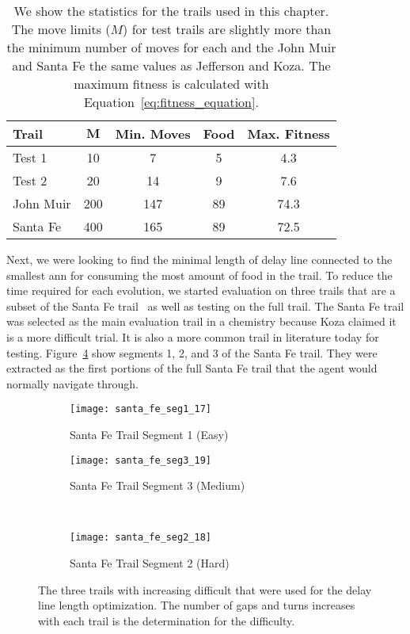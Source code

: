 \begin{table}[ht]
\centering
\begin{tabular}{lcccc}
\textbf{Trail}  & $\bm{M}$  & \textbf{Min. Moves} & \textbf{Food} & \textbf{Max. Fitness} \\ \hline
Test 1    & 10  & 7   & 5  & 4.3 \\ 
Test 2    & 20  & 14  & 9  & 7.6 \\
John Muir & 200 & 147 & 89 & 74.3 \\
Santa Fe  & 400 & 165 & 89 & 72.5
\end{tabular}
\caption[Moves Limits for Test Runs]{We show the statistics for the trails used in this chapter. The move limits ($M$) for test trails are slightly more than the minimum number of moves for each and the John Muir and Santa Fe the same values as Jefferson and Koza. The maximum fitness is calculated with Equation~\ref{eq:fitness_equation}.}
\label{tab:testing_moves_limit}
\end{table}

Next, we were looking to find the minimal length of delay line connected to the smallest \gls{ann} for consuming the most amount of food in the trail. To reduce the time required for each evolution, we started evaluation on three trails that are a subset of the Santa Fe trail~\cite{Koza1992-xs} as well as testing on the full trail. The Santa Fe trail was selected as the main evaluation trail in a chemistry because Koza claimed it is a more difficult trial. It is also a more common trail in literature today for testing. Figure~\ref{fig:sft_segments} show segments 1, 2, and 3 of the Santa Fe trail. They were extracted as the first portions of the full Santa Fe trail that the agent would normally navigate through.

\begin{figure}
\centering
\begin{subfigure}[b]{.5\textwidth}
    \centering
    \texttt{[image: santa\_fe\_seg1\_17]}
    \caption{Santa Fe Trail Segment 1 (Easy)}
    \label{fig:sft_seg1}
\end{subfigure}%
\begin{subfigure}[b]{.5\textwidth}
    \centering
    \texttt{[image: santa\_fe\_seg3\_19]}
    \caption{Santa Fe Trail Segment 3 (Medium)}
    \label{fig:sft_seg3}
\end{subfigure}
\\
\begin{subfigure}[b]{0.5\textwidth}
    \centering
    \texttt{[image: santa\_fe\_seg2\_18]}
    \caption{Santa Fe Trail Segment 2 (Hard)}
    \label{fig:sft_seg2}
\end{subfigure}
\caption[Three Santa Fe Trail Segments]{The three trails with increasing difficult that were used for the delay line length optimization. The number of gaps and turns increases with each trail is the determination for the difficulty.}
\label{fig:sft_segments}
\end{figure}

